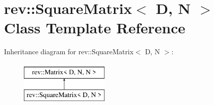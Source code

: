 \hypertarget{classrev_1_1_square_matrix}{}\section{rev\+::Square\+Matrix$<$ D, N $>$ Class Template Reference}
\label{classrev_1_1_square_matrix}
Inheritance diagram for rev\+::Square\+Matrix$<$ D, N $>$\+:\begin{figure}[H]
\begin{center}
\leavevmode
\includegraphics[height=2.000000cm]{classrev_1_1_square_matrix}
\end{center}
\end{figure}
